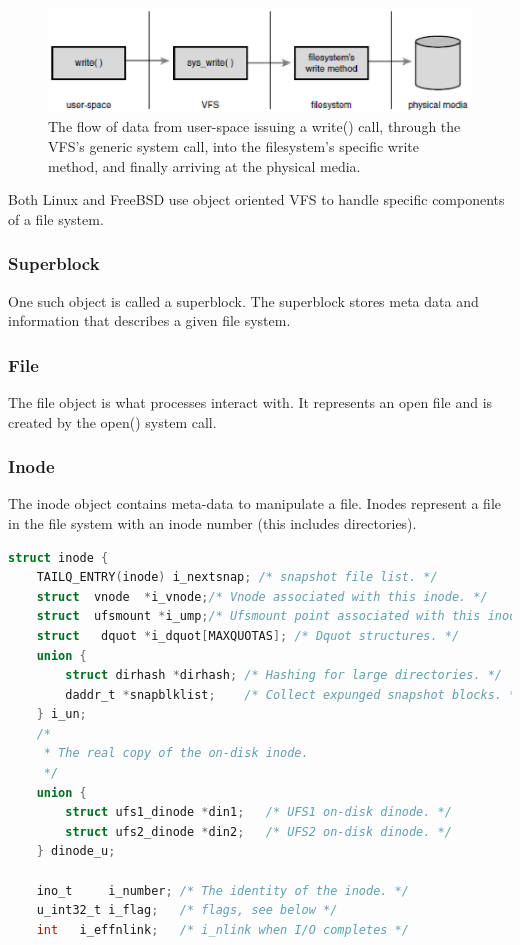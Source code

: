 \documentclass[letterpaper, 10pt, onecolumn, draftclsnofoot]{IEEEtran}
\begin{document}
\begin{figure}[H]
	\caption{The flow of data from user-space issuing a write() call, through the
VFS’s generic system call, into the filesystem’s specific write method, and finally arriving at the physical media.\cite{linux}}
  	\includegraphics[scale=1]{vfsd.eps}
\end{figure}

Both Linux and FreeBSD use object oriented VFS to handle specific components of a file system.\cite{linux, BSD}

\subsubsection{Superblock} 
One such object is called a superblock. The superblock stores meta data and information that describes a given file system.\cite{linux, BSD} 

\subsubsection{File}
The file object is what processes interact with. It represents an open file and is created by the open() system call.\cite{linux, BSD}

\subsubsection{Inode}
The inode object contains meta-data to manipulate a file. Inodes represent a file in the file system with an inode number (this includes directories).\cite{linux, BSD}

\begin{lstlisting}[language=C]
struct inode {
	TAILQ_ENTRY(inode) i_nextsnap; /* snapshot file list. */
	struct	vnode  *i_vnode;/* Vnode associated with this inode. */
	struct 	ufsmount *i_ump;/* Ufsmount point associated with this inode. */
	struct	 dquot *i_dquot[MAXQUOTAS]; /* Dquot structures. */
	union {
		struct dirhash *dirhash; /* Hashing for large directories. */
		daddr_t *snapblklist;    /* Collect expunged snapshot blocks. */
	} i_un;
	/*
	 * The real copy of the on-disk inode.
	 */
	union {
		struct ufs1_dinode *din1;	/* UFS1 on-disk dinode. */
		struct ufs2_dinode *din2;	/* UFS2 on-disk dinode. */
	} dinode_u;

	ino_t	  i_number;	/* The identity of the inode. */
	u_int32_t i_flag;	/* flags, see below */
	int	  i_effnlink;	/* i_nlink when I/O completes */
\end{lstlisting}
\end{document}
